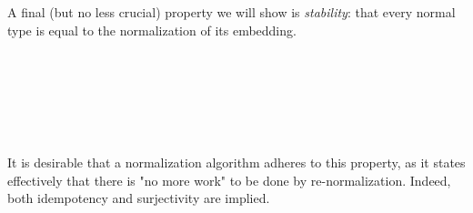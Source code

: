 \documentclass[authoryear, acmsmall, screen, review, nonacm]{acmart}
\begin{document}
A final (but no less crucial) property we will show is \emph{stability}: that every normal type is equal to the normalization of its embedding. 

\begin{code}%
\>[0]%
\>[12]\AgdaSymbol{:}\AgdaSpace{}%
\AgdaSpace{}%
\AgdaSymbol{(}\AgdaSpace{}%
\AgdaSymbol{:}\AgdaSpace{}%
\AgdaSpace{}%
\AgdaSpace{}%
\AgdaSymbol{)}\AgdaSpace{}%
\AgdaSpace{}%
\AgdaSpace{}%
\AgdaSymbol{(}\AgdaSpace{}%
\AgdaSymbol{)}\AgdaSpace{}%
\AgdaSpace{}%
\<%
\end{code}
\begin{code}[hide]%
\>[0]\AgdaSpace{}%
\AgdaSymbol{=}\AgdaSpace{}%
\AgdaSpace{}%
\AgdaSymbol{\AgdaUnderscore{}}\<%
\\
\>[0]\AgdaComment{--------------------------------------------------------------------------------}\<%
\\
\>[0]\<%
\\
\>[0]\<%
\\
\>[0]\<%
\\
\>[0]\<%
\end{code}

\Ni It is desirable that a normalization algorithm adheres to this property, as it states effectively that there is "no more work" to be done by re-normalization. Indeed, both idempotency and surjectivity are implied.
\end{document}
